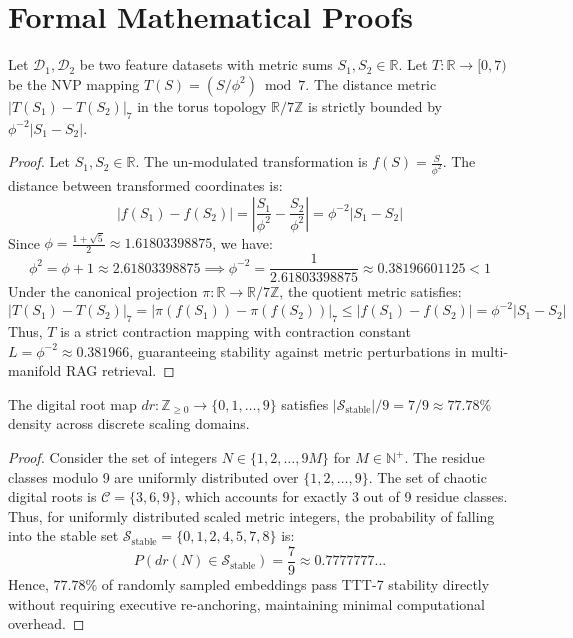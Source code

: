 \section{Formal Mathematical Proofs}

\begin{theorem}
Let $\mathcal{D}_1, \mathcal{D}_2$ be two feature datasets with metric sums $S_1, S_2 \in \mathbb{R}$. Let $T: \mathbb{R} \to [0, 7)$ be the NVP mapping $T(S) = (S / \phi^2) \bmod 7$. The distance metric $|T(S_1) - T(S_2)|_7$ in the torus topology $\mathbb{R} / 7\mathbb{Z}$ is strictly bounded by $\phi^{-2} |S_1 - S_2|$.
\end{theorem}

\begin{proof}
Let $S_1, S_2 \in \mathbb{R}$. The un-modulated transformation is $f(S) = \frac{S}{\phi^2}$.
The distance between transformed coordinates is:
\begin{equation}
    |f(S_1) - f(S_2)| = \left| \frac{S_1}{\phi^2} - \frac{S_2}{\phi^2} \right| = \phi^{-2} |S_1 - S_2|
\end{equation}
Since $\phi = \frac{1+\sqrt{5}}{2} \approx 1.61803398875$, we have:
\begin{equation}
    \phi^2 = \phi + 1 \approx 2.61803398875 \implies \phi^{-2} = \frac{1}{2.61803398875} \approx 0.38196601125 < 1
\end{equation}
Under the canonical projection $\pi: \mathbb{R} \to \mathbb{R} / 7\mathbb{Z}$, the quotient metric satisfies:
\begin{equation}
    |T(S_1) - T(S_2)|_7 = |\pi(f(S_1)) - \pi(f(S_2))|_7 \le |f(S_1) - f(S_2)| = \phi^{-2} |S_1 - S_2|
\end{equation}
Thus, $T$ is a strict contraction mapping with contraction constant $L = \phi^{-2} \approx 0.381966$, guaranteeing stability against metric perturbations in multi-manifold RAG retrieval.
\end{proof}

\begin{lemma}
The digital root map $dr: \mathbb{Z}_{\ge 0} \to \{0, 1, \dots, 9\}$ satisfies $|\mathcal{S}_{\text{stable}}| / 9 = 7/9 \approx 77.78\%$ density across discrete scaling domains.
\end{lemma}

\begin{proof}
Consider the set of integers $N \in \{1, 2, \dots, 9M\}$ for $M \in \mathbb{N}^+$. The residue classes modulo 9 are uniformly distributed over $\{1, 2, \dots, 9\}$. The set of chaotic digital roots is $\mathcal{C} = \{3, 6, 9\}$, which accounts for exactly 3 out of 9 residue classes. Thus, for uniformly distributed scaled metric integers, the probability of falling into the stable set $\mathcal{S}_{\text{stable}} = \{0, 1, 2, 4, 5, 7, 8\}$ is:
\begin{equation}
    P(dr(N) \in \mathcal{S}_{\text{stable}}) = \frac{7}{9} \approx 0.7777777...
\end{equation}
Hence, $77.78\%$ of randomly sampled embeddings pass TTT-7 stability directly without requiring executive re-anchoring, maintaining minimal computational overhead.
\end{proof}
